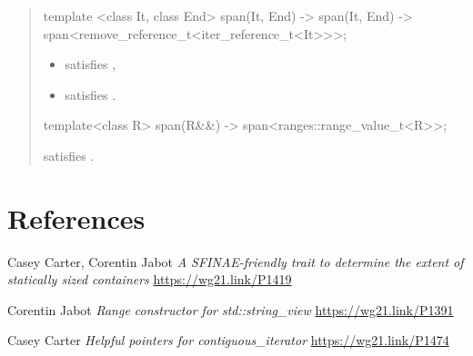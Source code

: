 \documentclass{wg21}
\begin{document}
\begin{quote}
\begin{addedblock}
\begin{itemdecl}
template <class It, class End>
span(It, End) -> span(It, End) -> span<remove_reference_t<iter_reference_t<It>>>;
\end{itemdecl}
\begin{itemdescr}
    \constraints
\begin{itemize}
    \item {} satisfies ,
    \item {} satisfies .
\end{itemize}

\end{itemdescr}

\begin{itemdecl}
template<class R>
span(R&&) -> span<ranges::range_value_t<R>>;
\end{itemdecl}
\begin{itemdescr}
    \constraints {} satisfies .
\end{itemdescr}


\end{addedblock}

\end{quote}

\section{References}
\renewcommand{\section}[2]{}%
\begin{thebibliography}{9}

    Casey Carter, Corentin Jabot
    \emph{A SFINAE-friendly trait to determine the extent of statically sized containers}\newline
    \url{https://wg21.link/P1419}

    Corentin Jabot
    \emph{Range constructor for std::string\_view}\newline
    \url{https://wg21.link/P1391}


    Casey Carter
    \emph{Helpful pointers for contiguous_iterator}\newline
    \url{https://wg21.link/P1474}


\end{thebibliography}
\end{document}
